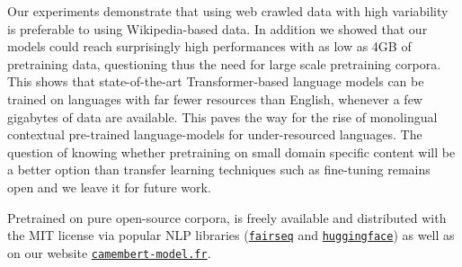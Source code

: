 Our experiments demonstrate that using web crawled
data with high variability is preferable to using Wikipedia-based data.  In addition we
showed that our models could reach surprisingly high performances with
as low as 4GB of pretraining data, questioning thus the need for large
scale pretraining corpora.  This shows that state-of-the-art
Transformer-based language models can be trained on languages with far
fewer resources than English, whenever a few gigabytes of data are
available. This paves the way for the rise of monolingual contextual
pre-trained language-models for under-resourced languages.  The
question of knowing whether pretraining on small domain specific
content will be a better option than transfer learning techniques such
as fine-tuning remains open and we leave it for future work.

Pretrained on pure open-source corpora, \camembert is freely available and distributed with the MIT license via popular NLP libraries (\href{https://github.com/pytorch/fairseq}{\texttt{fairseq}} and \href{https://github.com/huggingface/transformers}{\texttt{huggingface}}) as well as on our website \href{https://camembert-model.fr}{\texttt{camembert-model.fr}}.



